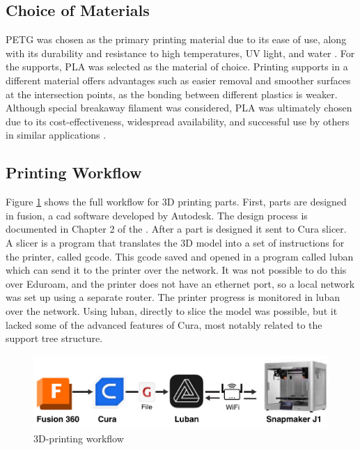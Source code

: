 \subsection{Choice of Materials}
PETG was chosen as the primary printing material due to its ease of use, along with its durability and resistance to high temperatures, UV light, and water \cite{oconnellPETGVsPLA2023}.
For the supports, PLA was selected as the material of choice.
Printing supports in a different material offers advantages such as easier removal and smoother surfaces at the intersection points, as the bonding between different plastics is weaker.
Although special breakaway filament was considered, PLA was ultimately chosen due to its cost-effectiveness, widespread availability, and successful use by others in similar applications \cite{SupportFilamentPETG2023}.

\subsection{Printing Workflow}
Figure \ref{fig:3dp_workflow} shows the full workflow for 3D printing parts.
First, parts are designed in \gls{fusion}, a \gls{cad} software developed by Autodesk.
The design process is documented in Chapter 2 of the \preproject.
After a part is designed it sent to Cura slicer.
A slicer is a program that translates the 3D model into a set of instructions for the printer, called \gls{gcode}.
This \gls{gcode} saved and opened in a program called \gls{luban} which can send it to the printer over the network.
It was not possible to do this over Eduroam, and the printer does not have an ethernet port, so a local network was set up using a separate router.
The printer progress is monitored in \gls{luban} over the network.
Using \gls{luban}, directly to slice the model was possible, but it lacked some of the advanced features of Cura, most notably related to the support tree structure.


\begin{figure}[H]
    \centering
    \includegraphics[width=\textwidth]{figures/3d_print/pipeline.pdf}
    \caption{3D-printing workflow \cite{autodeskFusion360Logo} \cite{delaragoCuraLogo2022} \cite{jupi007GcodeIconProposal2020} \cite{snapmakerSnapmakerLogo2020} \cite{snapmakerSnapmakerJ1High}}
    \label{fig:3dp_workflow}
\end{figure}

